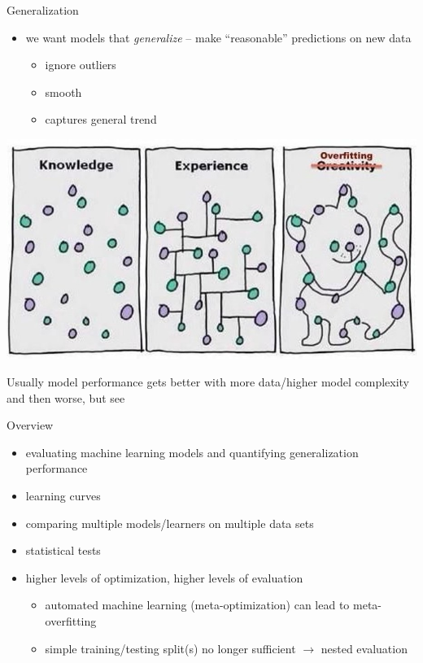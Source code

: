 \begin{frame}[c]{Generalization}
    \begin{itemize}
        \item we want models that \emph{generalize} -- make ``reasonable''
            predictions on new data
            \begin{itemize}
                \item ignore outliers
                \item smooth
                \item captures general trend
            \end{itemize}
    \end{itemize}
    \begin{center}
        \includegraphics[width=.5\textwidth]{images/overfitting1}
    \end{center}
    Usually model performance gets better with more data/higher model complexity
    and then worse, but see %
\end{frame}

\begin{frame}[c]{Overview}
    \begin{itemize}
        \item evaluating machine learning models and quantifying generalization
            performance
        \item learning curves
        \item comparing multiple models/learners on multiple data sets
        \item statistical tests
        \item higher levels of optimization, higher levels of evaluation
            \begin{itemize}
                \item automated machine learning (meta-optimization) can lead to
                    meta-overfitting
                \item simple training/testing split(s) no longer sufficient
                    $\rightarrow$ nested evaluation
            \end{itemize}
    \end{itemize}
\end{frame}


